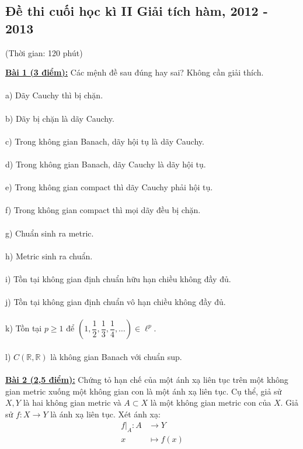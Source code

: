 \documentclass[10pt, a4paper]{article}
\begin{document}
\newpage

\subsection{Đề thi cuối học kì II Giải tích hàm, 2012 - 2013}
\begin{center}
	\color{blue}(Thời gian: 120 phút)
\end{center}
\color{red}\underline{\textbf{Bài 1 (3 điểm):}} \color{black}Các mệnh đề sau đúng hay sai? Không cần giải thích.\\\\
\color{red}a) \color{black}Dãy Cauchy thì bị chặn.\\\\
\color{red}b) \color{black}Dãy bị chặn là dãy Cauchy.\\\\
\color{red}c) \color{black}Trong không gian Banach, dãy hội tụ là dãy Cauchy.\\\\
\color{red}d) \color{black}Trong không gian Banach, dãy Cauchy là dãy hội tụ.\\\\
\color{red}e) \color{black}Trong không gian compact thì dãy Cauchy phải hội tụ.\\\\
\color{red}f) \color{black}Trong không gian compact thì mọi dãy đều bị chặn.\\\\
\color{red}g) \color{black}Chuẩn sinh ra metric.\\\\
\color{red}h) \color{black}Metric sinh ra chuẩn.\\\\
\color{red}i) \color{black}Tồn tại không gian định chuẩn hữu hạn chiều không đầy đủ.\\\\
\color{red}j) \color{black}Tồn tại không gian định chuẩn vô hạn chiều không đầy đủ.\\\\
\color{red}k) \color{black}Tồn tại $p\ge1$ để $\left(1,\dfrac12,\dfrac13,\dfrac14,\dots\right)\in\ell^p$.\\\\
\color{red}l) \color{black}$C(\mathbb R,\mathbb R)$ là không gian Banach với chuẩn sup.\\\\
\color{red}\underline{\textbf{Bài 2 (2,5 điểm):}} \color{black}Chứng tỏ hạn chế của một ánh xạ liên tục trên một không gian metric xuống một không gian con là một ánh xạ liên tục. Cụ thể, giả sử $X,Y$ là hai không gian metric và $A\subset X$ là một không gian metric con của $X$. Giả sử $f:X\to Y$ là ánh xạ liên tục. Xét ánh xạ: \begin{align*}
	f\big|_A:A&\to Y\\
	x&\mapsto f(x)
\end{align*}
\end{document}
